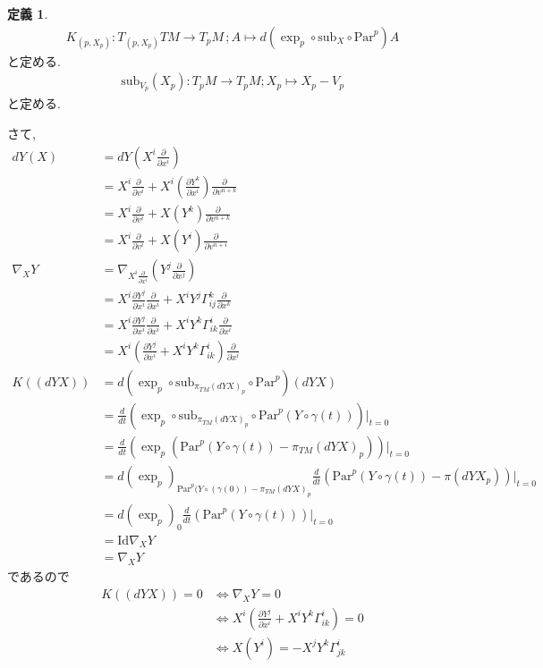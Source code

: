 \documentclass[twocolumn, landscape, a4paper , 8pt, fleqn, titlepage ]{jsarticle}
\theoremstyle{definition}
\newtheorem{dfn}{定義}[section]
\newcommand{\LR}{\Leftrightarrow}
\newcommand{\sub}{\textrm{sub}}
\newcommand{\Par}{\textrm{Par}}
\begin{document}
\begin{dfn}
\begin{align*} K_{(p,X_p)} : T_{(p,X_p)} T M \rightarrow T_p M  \, ; A \mapsto d(\exp_p \circ \sub _X \circ \Par^p) A  \end{align*}
と定める. 
\begin{align*} \sub_{V_p} (X_p) : T_pM \rightarrow T_pM ; X_p \mapsto X_p - V_p  \end{align*}
と定める. 
\end{dfn}
さて, 
\begin{align*} 
dY(X) &= dY(X^i \frac{\partial}{\partial x^i }) \\ &= X^i \frac{\partial}{\partial v^i } + X^i (\frac{\partial Y^k}{\partial x^i }) \frac{\partial}{\partial v^{n+k} } \\
&= X^i\frac{\partial}{\partial v^i } + X(Y^k) \frac{\partial}{\partial v^{n+k} } \\&= X^i \frac{\partial}{\partial v^i }  + X(Y^i) \frac{\partial}{\partial v^{n+i} } \\
\nabla_X Y &= \nabla_{X^i \frac{\partial}{\partial x^i } }(Y^j \frac{\partial}{\partial x^j } ) \\&= X^i  \frac{\partial Y^j}{\partial x^i } \frac{\partial}{\partial x^i } + X^iY^j \Gamma_{ij}^k   \frac{\partial}{\partial x^k } \\
&= X^i  \frac{\partial Y^j}{\partial x^i } \frac{\partial}{\partial x^i } + X^iY^k \Gamma_{ik}^i   \frac{\partial}{\partial x^i }  \\
&= X^i  (\frac{\partial Y^j}{\partial x^i } + X^iY^k \Gamma_{ik}^i )  \frac{\partial}{\partial x^i }  \\
K((dYX)) &= d(\exp _p \circ \sub_{\pi_{TM} (dYX)_p } \circ \Par^p )(dYX)  \\&= \frac{d}{dt} (\exp _p \circ \sub_{\pi_{TM} (dYX)_p} \circ \Par^p (Y \circ \gamma (t) )) |_{t =0} \\&= \frac{d}{dt}(\exp_p (\Par^p(Y \circ \gamma(t)) - \pi_{TM} (dYX)_p)) |_{t = 0} \\&= d(\exp _p)_{\Par^p (Y\circ (\gamma(0) ) - \pi_{TM}(dYX)_p } \frac{d}{dt}(\Par^p(Y\circ \gamma(t)) - \pi (dYX_p)) |_{t=0} \\&= d(\exp_p)_0 \frac{d}{dt}(\Par^p(Y\circ \gamma(t)) )|_{t=0} \\&= \textrm{Id} \nabla_X Y \\&= \nabla_X Y
\end{align*}
であるので
\begin{align*} K((dYX)) = 0 &\LR \nabla_X Y = 0 \\&\LR X^i  (\frac{\partial Y^j}{\partial x^i } + X^iY^k \Gamma_{ik}^i )  = 0 \\&\LR  X(Y^i) = - X^j Y^k \Gamma_{jk}^i  \end{align*}
\end{document}
